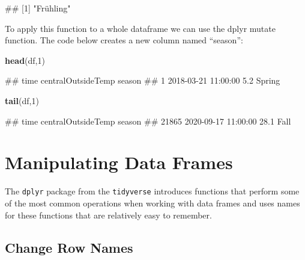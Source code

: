 \documentclass[
]{book}
\newenvironment{Shaded}{\begin{snugshade}}{\end{snugshade}}
\newcommand{\DataTypeTok}[1]{\textcolor[rgb]{0.13,0.29,0.53}{#1}}
\newcommand{\DecValTok}[1]{\textcolor[rgb]{0.00,0.00,0.81}{#1}}
\newcommand{\KeywordTok}[1]{\textcolor[rgb]{0.13,0.29,0.53}{\textbf{#1}}}
\newcommand{\NormalTok}[1]{#1}
\newcommand{\OperatorTok}[1]{\textcolor[rgb]{0.81,0.36,0.00}{\textbf{#1}}}
\newcommand{\StringTok}[1]{\textcolor[rgb]{0.31,0.60,0.02}{#1}}
\let\oldShaded\Shaded
\let\endoldShaded\endShaded
\renewenvironment{Shaded}{\footnotesize\oldShaded}{\endoldShaded}
\let\oldverbatim\verbatim
\let\endoldverbatim\endverbatim
\renewenvironment{verbatim}{\footnotesize\oldverbatim}{\endoldverbatim}
\begin{document}
\begin{verbatim}
## [1] "Frühling"
\end{verbatim}

To apply this function to a whole dataframe we can use the dplyr mutate function. The code below creates a new column named ``season'':

\begin{Shaded}
\end{Shaded}

\begin{Shaded}
\begin{Highlighting}[]
\KeywordTok{head}\NormalTok{(df,}\DecValTok{1}\NormalTok{)}
\end{Highlighting}
\end{Shaded}

\begin{verbatim}
##                  time centralOutsideTemp season
## 1 2018-03-21 11:00:00                5.2 Spring
\end{verbatim}

\begin{Shaded}
\begin{Highlighting}[]
\KeywordTok{tail}\NormalTok{(df,}\DecValTok{1}\NormalTok{)}
\end{Highlighting}
\end{Shaded}

\begin{verbatim}
##                      time centralOutsideTemp season
## 21865 2020-09-17 11:00:00               28.1   Fall
\end{verbatim}

\hypertarget{manipulating-data-frames}{%
\section{Manipulating Data Frames}\label{manipulating-data-frames}}

The \texttt{dplyr} package from the \texttt{tidyverse} introduces functions that perform some of the most common operations when working with data frames and uses names for these functions that are relatively easy to remember.

\hypertarget{change-row-names}{%
\subsection{Change Row Names}\label{change-row-names}}
\end{document}
